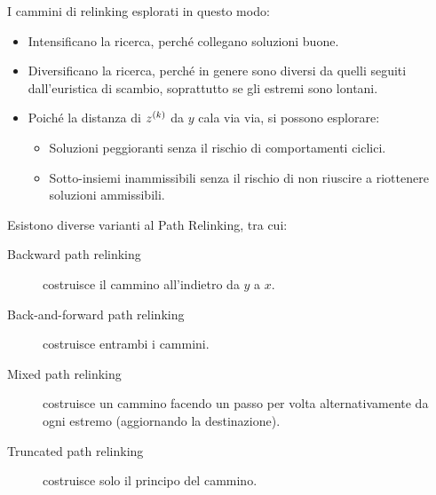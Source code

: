 \documentclass[\main/main.tex]{subfiles}
\begin{document}
\begin{definition}
    I cammini di relinking esplorati in questo modo:
    \begin{itemize}
        \item Intensificano la ricerca, perché collegano soluzioni buone.
        \item Diversificano la ricerca, perché in genere sono diversi da quelli seguiti dall'euristica di scambio, soprattutto se gli estremi sono lontani.
        \item Poiché la distanza di \(z^{\left(k\right)}\) da \(y\) cala via via, si possono esplorare:
        \begin{itemize}
            \item Soluzioni peggioranti senza il rischio di comportamenti ciclici.
            \item Sotto-insiemi inammissibili senza il rischio di non riuscire a riottenere soluzioni ammissibili.
        \end{itemize}
    \end{itemize}
\end{definition}
\begin{observation}
    Esistono diverse varianti al Path Relinking, tra cui:
    \begin{description}
    \item[Backward path relinking] costruisce il cammino all'indietro da \(y\) a \(x\).
    \item[Back-and-forward path relinking] costruisce entrambi i cammini.
    \item[Mixed path relinking] costruisce un cammino facendo un passo per volta alternativamente da ogni estremo (aggiornando la destinazione).
    \item[Truncated path relinking] costruisce solo il principo del cammino.
    \end{description}    
\end{observation}
\end{document}
